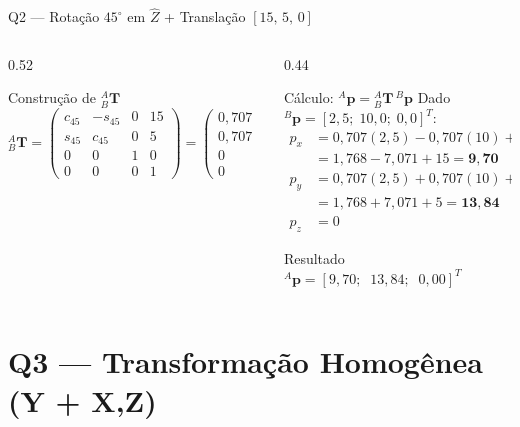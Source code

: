 \documentclass[aspectratio=169,12pt]{beamer}
\newcommand{\Trans}[2]{{}^{#1}_{#2}\!\mathbf{T}}
\newcommand{\degr}{^{\circ}}
\newcommand{\mat}[1]{\begin{pmatrix}#1\end{pmatrix}}
\begin{document}
\begin{frame}{Q2 --- Rotação $45\degr$ em $\hat{Z}$ + Translação $[15,\,5,\,0]$}
  \begin{columns}
    \begin{column}{0.52\textwidth}
      \begin{block}{Construção de $\Trans{A}{B}$}
        \[
          \Trans{A}{B} = \mat{c_{45}&-s_{45}&0&15\\s_{45}&c_{45}&0&5\\0&0&1&0\\0&0&0&1}
          = \mat{0{,}707&-0{,}707&0&15\\0{,}707&0{,}707&0&5\\0&0&1&0\\0&0&0&1}
        \]
      \end{block}
    \end{column}
    \begin{column}{0.44\textwidth}
      \begin{block}{Cálculo: ${}^{A}\mathbf{p} = \Trans{A}{B}\,{}^{B}\mathbf{p}$}
        \small
        Dado ${}^{B}\mathbf{p} = [2{,}5;\;10{,}0;\;0{,}0]^T$:
        \begin{align*}
          p_x &= 0{,}707(2{,}5) - 0{,}707(10) + 15\\
              &= 1{,}768 - 7{,}071 + 15 = \mathbf{9{,}70}\\[4pt]
          p_y &= 0{,}707(2{,}5) + 0{,}707(10) + 5\\
              &= 1{,}768 + 7{,}071 + 5 = \mathbf{13{,}84}\\[4pt]
          p_z &= 0
        \end{align*}
      \end{block}
      \begin{exampleblock}{Resultado}
        ${}^{A}\mathbf{p} = [9{,}70;\;\;13{,}84;\;\;0{,}00]^T$
      \end{exampleblock}
    \end{column}
  \end{columns}
\end{frame}

\section{Q3 --- Transformação Homogênea (Y + X,Z)}
\end{document}
